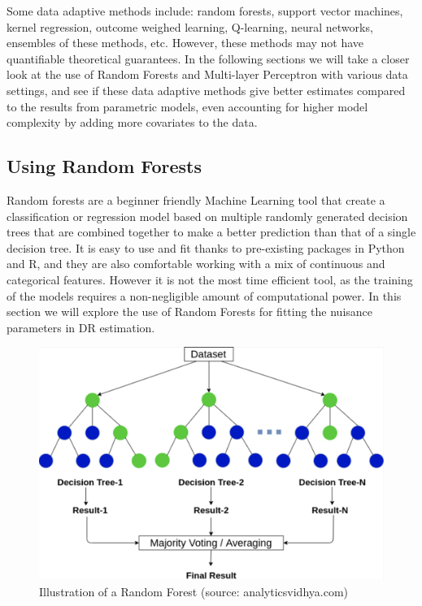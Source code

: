 \documentclass[12pt,twoside]{article}
\begin{document}
Some data adaptive methods include: random forests, support vector machines, kernel regression, outcome weighed learning, Q-learning, neural networks, ensembles of these methods, etc. However, these methods may not have quantifiable theoretical guarantees. In the following sections we will take a closer look at the use of Random Forests and Multi-layer Perceptron  with various data settings, and see if these data adaptive methods give better estimates compared to the results from parametric models, even accounting for higher model complexity by adding more covariates to the data.

\subsection{Using Random Forests}

Random forests are a beginner friendly Machine Learning tool that create a classification or regression model based on multiple randomly generated decision trees that are combined together to make a better prediction than that of a single decision tree. It is easy to use and fit thanks to pre-existing packages in Python and R, and they are also comfortable working with a mix of continuous and categorical features. However it is not the most time efficient tool, as the training of the models requires a non-negligible amount of computational power. In this section we will explore the use of Random Forests for fitting the nuisance parameters in DR estimation.

\begin{figure}
    \centering
    \includegraphics[width = 0.7\columnwidth]{figures/tree.png}
    \caption{Illustration of a Random Forest (source: analyticsvidhya.com)}
    \label{fig:my_label}
\end{figure}

\end{document}

